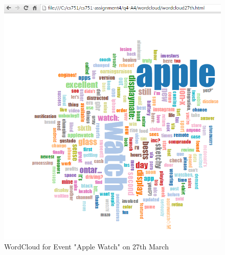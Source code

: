 \documentclass[12pt]{Report}
\begin{document}
\begin{figure}[ht]    
    \begin{center}
        \includegraphics[scale=0.60]{word27th.png}
        \caption{WordCloud for Event "Apple Watch" on 27th March }
        \label{WordCloud for Event "Apple Watch" on 27th March}
    \end{center}
\end{figure}
\end{document}
